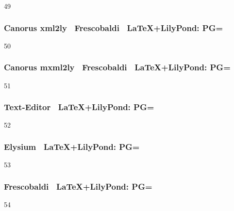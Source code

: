 49

\subsubsection{Canorus \ra xml2ly \ra\ Frescobaldi \ra\ \LaTeX+LilyPond: PG=}

50

\subsubsection{Canorus \ra mxml2ly \ra\ Frescobaldi \ra\ \LaTeX+LilyPond: PG=}

51

\subsubsection{Text-Editor \ra\ \LaTeX+LilyPond: PG=}

52

\subsubsection{Elysium \ra\ \LaTeX+LilyPond: PG=}

53
\subsubsection{Frescobaldi \ra\ \LaTeX+LilyPond: PG=}

54



